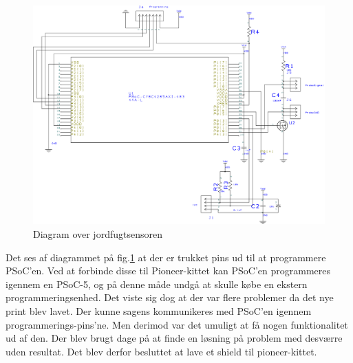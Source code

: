\begin{figure}[H]
	\centering 
\includegraphics[scale=0.2]{HardwareArkitektur/Sensore/Jordfugt_billeder/Diagram_jordfugt.png}
	\caption{Diagram over jordfugtsensoren}
	\label{photo:Diagram_jordfugt}
\end{figure} 

Det ses af diagrammet på fig.\ref{photo:Diagram_jordfugt} at der er trukket pins ud til at programmere PSoC'en. Ved at forbinde disse til Pioneer-kittet kan PSoC'en programmeres igennem en PSoC-5, og på denne måde undgå at skulle købe en ekstern programmeringsenhed. Det viste sig dog at der var flere problemer da det nye print blev lavet. Der kunne sagens kommunikeres med PSoC'en igennem programmerings-pins'ne. Men derimod var det umuligt at få nogen funktionalitet ud af den. Der blev brugt dage på at finde en løsning på problem med desværre uden resultat. Det blev derfor besluttet at lave et shield til pioneer-kittet.

